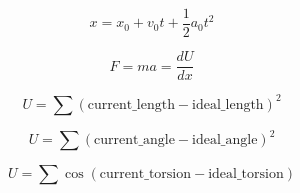 \documentclass{article}
\begin{document}
$$x = x_0 + v_0 t + \frac{1}{2} a_0 t^2$$

$$F = m a = \frac{dU}{dx}$$

$$U = \sum (\textrm{current\_length} - \textrm{ideal\_length})^2$$

$$U = \sum (\textrm{current\_angle} - \textrm{ideal\_angle})^2$$

$$U = \sum \cos(\textrm{current\_torsion} - \textrm{ideal\_torsion})$$
\end{document}
